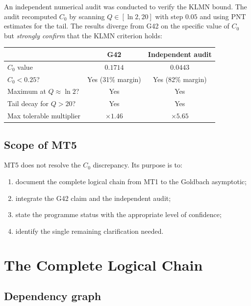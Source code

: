 \documentclass[11pt,a4paper]{article}
\begin{document}
An independent numerical audit was conducted to verify the KLMN bound.  The audit recomputed $C_0$ by scanning $Q\in[\ln 2, 20]$ with step $0.05$ and using PNT estimates for the tail.  The results diverge from G42 on the specific value of $C_0$ but \emph{strongly confirm} that the KLMN criterion holds:

\begin{center}
\begin{tabular}{@{}lcc@{}}
\toprule
& \textbf{G42} & \textbf{Independent audit} \\
\midrule
$C_0$ value & $0.1714$ & $0.0443$ \\
$C_0 < 0.25$? & Yes (31\% margin) & Yes (82\% margin) \\
Maximum at $Q\approx\ln 2$? & Yes & Yes \\
Tail decay for $Q>20$? & Yes & Yes \\
Max tolerable multiplier & $\times 1.46$ & $\times 5.65$ \\
\bottomrule
\end{tabular}
\end{center}

\subsection{Scope of MT5}

MT5 does not resolve the $C_0$ discrepancy.  Its purpose is to:
\begin{enumerate}[nosep]
    \item document the complete logical chain from MT1 to the Goldbach asymptotic;
    \item integrate the G42 claim and the independent audit;
    \item state the programme status with the appropriate level of confidence;
    \item identify the single remaining clarification needed.
\end{enumerate}

\section{The Complete Logical Chain}

\subsection{Dependency graph}
\end{document}
